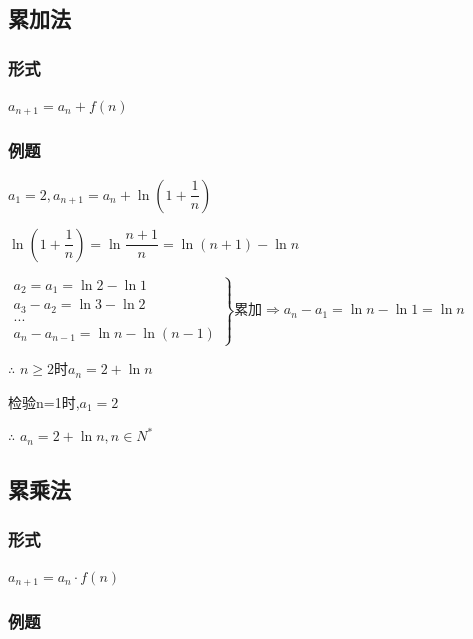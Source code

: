 \documentclass[10pt,cn]{elegantbook}
\begin{document}
        \subsection{累加法}
        \subsubsection*{形式}
        $a_{n+1}=a_{n}+f(n)$
        \subsubsection*{例题}
        
        $a_{1}=2,a_{n+1}=a_{n}+\ln (1+\dfrac{1}{n})$
        
        \begin{tcolorbox}[colback=yellow!10!white, colframe=red!50!black]
        	$\ln (1+\dfrac{1}{n})=\ln \dfrac{n+1}{n} = \ln (n+1)-\ln n$
        	
            	$
            \left.
            \begin{aligned}
            a_{2}=a_{1}= \ln 2-\ln 1 \\
            a_{3}-a_{2}=\ln 3 -\ln 2\\
            ...\\
              a_{n}-a_{n-1}=\ln n-\ln (n-1)
            \end{aligned}
            \right\}
             \text{累加} \Rightarrow a_{n}-a_{1}=\ln n -\ln 1=\ln n
               $
               
                  
               $ \therefore$ $n \geq 2$时$a_{n}=2+\ln n$
               
               检验\quad n=1时,$a_{1}=2$
               
               $ \therefore $ $a_{n}=2+\ln n ,n \in N^{*}$
        \end{tcolorbox}
     
     
      \subsection{累乘法}
     \subsubsection*{形式}
     $a_{n+1}=a_{n} \cdot f(n)$
     \subsubsection*{例题}
     
\end{document}
